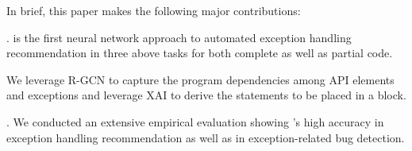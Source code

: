 
In brief, this paper makes the following major contributions:

. {\tool} is the first neural network approach to
  automated exception handling recommendation in three above tasks for both complete as
  well as partial code.

   We
  leverage R-GCN to capture the program
  dependencies among API elements and exceptions and leverage XAI
  to derive the statements to be placed in a  block.

. We conducted an extensive
empirical evaluation showing {\tool}'s high accuracy in exception
handling recommendation as well as in exception-related bug detection.



